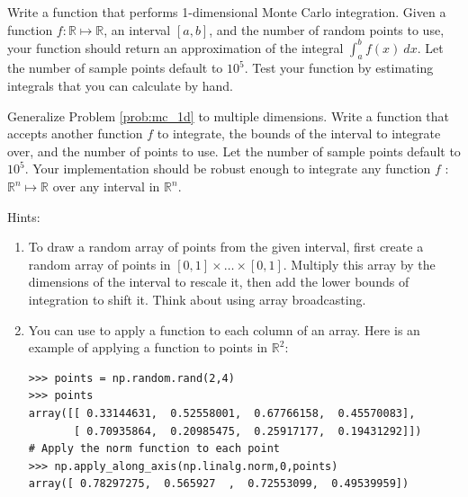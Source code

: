 \begin{problem}
\label{prob:mc_1d}
Write a function that performs 1-dimensional Monte Carlo integration. 
Given a function $f: \mathbb{R} \mapsto \mathbb{R}$, an interval ${[a,b]}$, and the number of random points to use, your function should return an approximation of the integral
$\int_a^b f(x)\:dx$.
Let the number of sample points default to $10^5$.
Test your function by estimating integrals that you can calculate by hand.

\end{problem}



\begin{problem}
\label{prob:mc}
Generalize Problem \ref{prob:mc_1d} to multiple dimensions. 
Write a function that accepts another function $f$ to integrate, the bounds of the interval to integrate over, and the number of points to use. 
Let the number of sample points default to $10^5$.
Your implementation should be robust enough to integrate any function $f$ : $\mathbb{R}^n \mapsto \mathbb{R}$ over any interval in $\mathbb{R}^n$.


Hints:
\begin{enumerate}
\item To draw a random array of points from the given interval, first create a random array of points in $[0,1] \times \ldots \times [0,1]$.
Multiply this array by the dimensions of the interval to rescale it, then add the lower bounds of integration to shift it.
Think about using array broadcasting.

\item You can use  to apply a function to each column of an array. 
Here is an example of applying a function to points in $\mathbb{R}^2$:

\begin{lstlisting}
>>> points = np.random.rand(2,4)
>>> points
array([[ 0.33144631,  0.52558001,  0.67766158,  0.45570083],
       [ 0.70935864,  0.20985475,  0.25917177,  0.19431292]])
# Apply the norm function to each point
>>> np.apply_along_axis(np.linalg.norm,0,points)
array([ 0.78297275,  0.565927  ,  0.72553099,  0.49539959])
\end{lstlisting}


\end{enumerate}
\end{problem}
